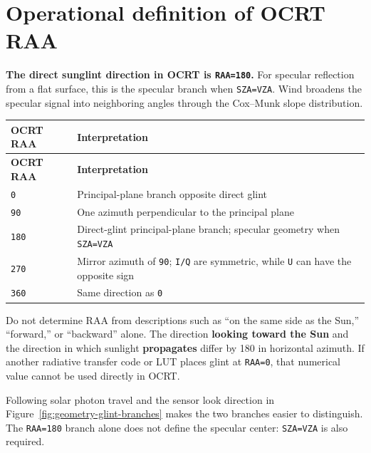 


\section{Operational definition of OCRT RAA}
\label{sec:auto:01_concepts_geometry:4}
\textbf{The direct sunglint direction in OCRT is \texttt{RAA=\allowbreak{}180\textdegree{}}.} For specular reflection from a flat surface, this is the specular branch when \texttt{SZA=\allowbreak{}VZA}. Wind broadens the specular signal into neighboring angles through the Cox--Munk slope distribution.


{\TableFont
\begin{longtable}{@{}>{\raggedright\arraybackslash}p{}>{\raggedright\arraybackslash}p{}@{}}
\toprule
\textbf{OCRT RAA} & \textbf{Interpretation} \\
\midrule
\endfirsthead
\toprule
\textbf{OCRT RAA} & \textbf{Interpretation} \\
\midrule
\endhead
\bottomrule
\endfoot
\texttt{0\textdegree{}} & Principal-plane branch opposite direct glint \\
\texttt{90\textdegree{}} & One azimuth perpendicular to the principal plane \\
\texttt{180\textdegree{}} & Direct-glint principal-plane branch; specular geometry when \texttt{SZA=\allowbreak{}VZA} \\
\texttt{270\textdegree{}} & Mirror azimuth of \texttt{90\textdegree{}}; \texttt{I/\allowbreak{}Q} are symmetric, while \texttt{U} can have the opposite sign \\
\texttt{360\textdegree{}} & Same direction as \texttt{0\textdegree{}} \\
\end{longtable}
}

Do not determine RAA from descriptions such as “on the same side as the Sun,” “forward,” or “backward” alone. The direction \textbf{looking toward the Sun} and the direction in which sunlight \textbf{propagates} differ by 180\textdegree{} in horizontal azimuth. If another radiative transfer code or LUT places glint at \texttt{RAA=\allowbreak{}0\textdegree{}}, that numerical value cannot be used directly in OCRT.

Following solar photon travel and the sensor look direction in Figure~\ref{fig:geometry-glint-branches} makes the two branches easier to distinguish. The \texttt{RAA=180\textdegree{}} branch alone does not define the specular center: \texttt{SZA=VZA} is also required.

